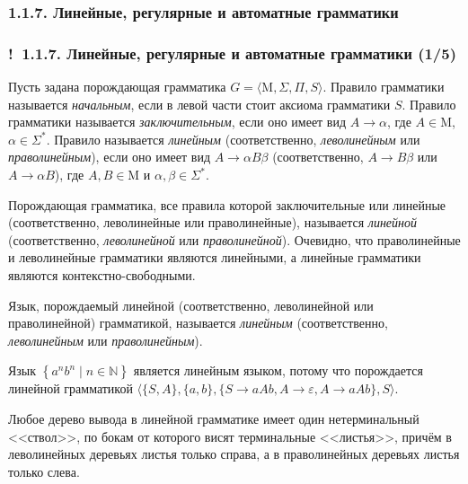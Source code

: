 \documentclass[mathserif,12pt,aspectratio=169]{beamer}
\renewcommand{\index}[1]{}
\def\odmkey#1#2{{\it\color{red} #1}\index{#2}}
\def\Set#1#2{\left\{ #1 \mid #2 \right\}}
\let\Bbb\mathbb
\def\Ok{{\color{green}\textbf{!}\ }}
\begin{document}
\subsubsection{1.1.7. Линейные, регулярные и автоматные грамматики}\label{1.1.7.}
\begin{frame}
\frametitle{\Ok 1.1.7. Линейные, регулярные и автоматные грамматики (1/5)}

Пусть задана порождающая грамматика $G=\langle \mathrm{M}, \Sigma, \Pi, S\rangle$.
Правило грамматики называется
\odmkey{начальным}{Правило!начальное}, если 
в левой части стоит аксиома грамматики $S$.
Правило грамматики называется
\odmkey{заключительным}{Правило!заключительное}, если оно имеет
вид $A\rightarrow\alpha$, где $A\in \mathrm{M}$, $\alpha\in \Sigma^*$. 
Правило
называется \odmkey{линейным}{Правило!линейное}
(соответственно,
\odmkey{леволинейным}{Правило!леволинейное} или
 \odmkey{праволинейным}{Правило!праволинейное}),
если оно имеет вид $A\rightarrow \alpha B\beta$ (соответственно, $A\rightarrow B\beta$ или
$A\rightarrow \alpha B$), где $A, B \in \mathrm{M}$ и 
$\alpha, \beta\in \Sigma^*$.

\smallskip
Порождающая грамматика, все правила которой заключительные или
линейные (соответственно, леволинейные или праволинейные), называется
\odmkey{линейной}{Грамматика!линейная} (соответственно, 
\odmkey{леволинейной}{Грамматика!леволинейная} или
\odmkey{праволинейной}{Грамматика!праволинейная}). 
Очевидно,
что праволинейные и леволинейные грамматики
являются линейными, а линейные грамматики
являются контекстно-свободными.

\smallskip
Язык, порождаемый линейной (соответственно,
леволинейной или праволинейной) грамматикой,
называется    
\odmkey{линейным}{Язык!линейный} 
(соответственно, 
\odmkey{леволинейным}{Язык!леволинейный} или
\odmkey{праволинейным}{Язык!праволинейный}). 
\begin{example}
Язык $\Set{a^n b^n}{n\in \Bbb{N}}$ 
является линейным языком, потому что порождается 
линейной грамматикой
$\langle \{S, A\}, \{a,b\},
\{S\rightarrow aAb, A\rightarrow 
\varepsilon, A\rightarrow aAb\},S\rangle$.
\end{example}

\begin{remark}
Любое дерево вывода в линейной грамматике
имеет один нетерминальный <<ствол>>,
по бокам от которого висят терминальные 
<<листья>>, причём в леволинейных деревьях листья только справа, а в праволинейных деревьях листья только слева.
\end{remark}

\end{frame}
\end{document}
